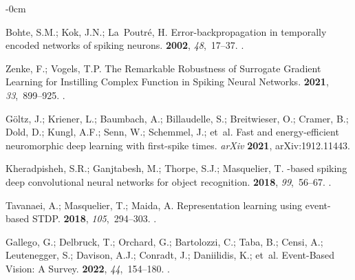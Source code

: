 \documentclass[brainsci, %
               review,accept,pdftex,moreauthors
               ]{Definitions/mdpi}
\begin{document}
\begin{adjustwidth}{-\extralength}{0cm}
\begin{thebibliography}{999}
Bohte, S.M.; Kok, J.N.; La~Poutré, H.
\newblock Error-backpropagation in temporally encoded networks of spiking
  neurons.
 {\bf 2002}, {\em 48},~17--37.
.

Zenke, F.; Vogels, T.P.
\newblock The {Remarkable} {Robustness} of {Surrogate} {Gradient} {Learning}
  for {Instilling} {Complex} {Function} in {Spiking} {Neural} {Networks}.
 {\bf 2021}, {\em 33},~899--925.
.

Göltz, J.; Kriener, L.; Baumbach, A.; Billaudelle, S.; Breitwieser, O.;
  Cramer, B.; Dold, D.; Kungl, A.F.; Senn, W.; Schemmel, J.;  et~al.
\newblock Fast and energy-efficient neuromorphic deep learning with first-spike
  times. \emph{arXiv}  \textbf{2021}, arXiv:1912.11443.


Kheradpisheh, S.R.; Ganjtabesh, M.; Thorpe, S.J.; Masquelier, T.
-based spiking deep convolutional neural networks for object
  recognition.
 {\bf 2018}, {\em 99},~56--67.
.

Tavanaei, A.; Masquelier, T.; Maida, A.
\newblock Representation learning using event-based {STDP}.
 {\bf 2018}, {\em 105},~294--303.
.

Gallego, G.; Delbruck, T.; Orchard, G.; Bartolozzi, C.; Taba, B.; Censi, A.;
  Leutenegger, S.; Davison, A.J.; Conradt, J.; Daniilidis, K.;  et~al.
\newblock Event-{Based} {Vision}: {A} {Survey}.
  {\bf 2022}, {\em 44},~154--180.
.


\end{thebibliography}
\end{adjustwidth}
\end{document}
